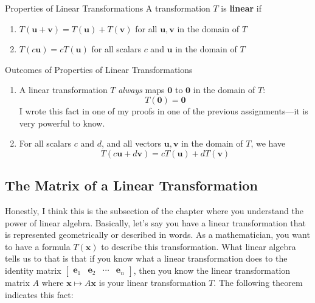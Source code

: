 \documentclass{article}
\begin{document}
\begin{boxcontainer}{Properties of Linear Transformations}
	A transformation $T$ is \textbf{linear} if

	\begin{enumerate}[label=\alph*)]
		\item
		      $T(\mathbf{u} + \mathbf{v}) = T(\mathbf{u}) + T(\mathbf{v})$ for all $\mathbf{u}, \mathbf{v}$ in the domain of $T$
		\item
		      $T(c\mathbf{u}) = cT(\mathbf{u})$ for all scalars $c$ and $\mathbf{u}$ in the domain of $T$
	\end{enumerate}
\end{boxcontainer}

\begin{remark}{Outcomes of Properties of Linear Transformations}
	\begin{enumerate}[label=\alph*),topsep=0pt]
		\item
		      A linear transformation $T$ \emph{always} maps $\mathbf{0}$ to $\mathbf{0}$ in the domain of $T$:
		      $$
			      T(\mathbf{0}) = \mathbf{0}
		      $$
		      I wrote this fact in one of my proofs in one of the previous assignments---it is very powerful to know.
		\item
		      For all scalars $c$ and $d$, and all vectors $\mathbf{u}, \mathbf{v}$ in the domain of $T$, we have
		      $$
			      T(c\mathbf{u} + d\mathbf{v}) = cT(\mathbf{u}) + dT(\mathbf{v})
		      $$
	\end{enumerate}
\end{remark}

\subsection{The Matrix of a Linear Transformation}
Honestly, I think this is the subsection of the chapter where you understand the power of linear algebra. Basically, let's say you have a linear transformation that is represented geometrically or described in words. As a mathematician, you want to have a formula $T(\mathbf{x})$ to describe this transformation. What linear algebra tells us to that is that if you know what a linear transformation does to the identity matrix $\begin{bmatrix} \mathbf{e}_1 & \mathbf{e}_2 & \cdots & \mathbf{e}_n \end{bmatrix}$, then you know the linear transformation matrix $A$ where $\mathbf{x} \mapsto A\mathbf{x}$ is your linear transformation $T$. The following theorem indicates this fact:
\end{document}
